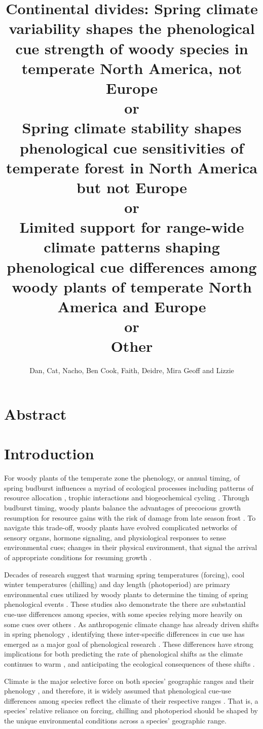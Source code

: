 \documentclass[12pt]{article}\usepackage[]{graphicx}\usepackage[]{color}
\title{Continental divides: Spring climate variability shapes the phenological cue strength of woody species in temperate North America, not Europe\\ or\\
Spring climate stability shapes phenological cue sensitivities of temperate forest in North America but not Europe\\ or\\
Limited support for range-wide climate patterns shaping phenological cue differences among woody plants of temperate North America and Europe \\or\\
Other
}
\author{Dan, Cat, Nacho, Ben Cook, Faith, Deidre, Mira Geoff and Lizzie}
\begin{document}
\maketitle

\section*{Abstract}
\section*{Introduction}
For woody plants of the temperate zone the phenology, or annual timing, of spring budburst influences a myriad of ecological processes including patterns of resource allocation \citep{Seiwa:1991vr}, trophic interactions \citep{Memmott2007} and biogeochemical cycling \citep{Piao2007}.
 Through budburst timing, woody plants balance the advantages of precocious growth resumption for resource gains with the risk of damage from late season frost \citep{Savage:2013aa}. To navigate this trade-off, woody plants have evolved complicated networks of sensory organs, hormone signaling, and physiological responses to sense environmental cues; changes in their physical environment, that signal the arrival of appropriate conditions for resuming growth \citep{Visser2010,}. %

Decades of research suggest that warming spring temperatures (forcing), cool winter temperatures (chilling) and day length (photoperiod) are primary environmental cues utilized by woody plants to determine the timing of spring phenological events \cite{Ettinger:2020aa,Forrest2010}. These studies also demonstrate the there are substantial cue-use differences among species, with some species relying more heavily on some cues over others \citep{Laube:2014aa,}. As anthropogenic climate change has already driven shifts in spring phenology \citep{Menzel2006}, identifying these inter-specific differences in cue use has emerged as a major goal of phenological research \citep{Chuine2002}. These differences have strong implications for both predicting the rate of phenological shifts as the climate continues to warm \citep{?}, and anticipating the ecological consequences of these shifts \citep{Cleland2012}.

Climate is the major selective force on both species' geographic ranges \citep{Morin:2011aa} and their phenology \citep{Savage:2013aa}, and therefore, it is widely assumed that phenological cue-use differences among species reflect the climate of their respective ranges \citep{Zohner:2017aa,Silvestro:2019wa}. That is, a species' relative reliance on forcing, chilling and photoperiod should be shaped by the unique environmental conditions across a species' geographic range.
\end{document}
